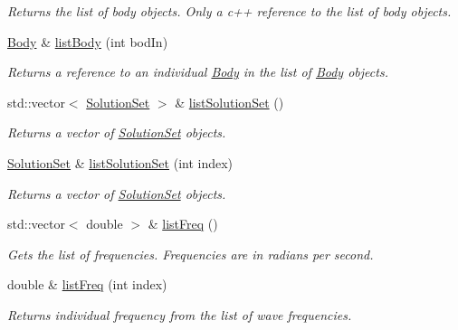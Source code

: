\begin{DoxyCompactItemize}
\begin{DoxyCompactList}\small\item\em Returns the list of body objects. Only a c++ reference to the list of body objects. \end{DoxyCompactList}\item 
\hyperlink{classosea_1_1ofreq_1_1_body}{Body} \& \hyperlink{classosea_1_1ofreq_1_1_output_derived_abda178375c603cd2d2efcc0c5f9c1f10}{list\-Body} (int bod\-In)
\begin{DoxyCompactList}\small\item\em Returns a reference to an individual \hyperlink{classosea_1_1ofreq_1_1_body}{Body} in the list of \hyperlink{classosea_1_1ofreq_1_1_body}{Body} objects. \end{DoxyCompactList}\item 
std\-::vector$<$ \hyperlink{classosea_1_1ofreq_1_1_solution_set}{Solution\-Set} $>$ \& \hyperlink{classosea_1_1ofreq_1_1_output_derived_accfe4955f3f0009638dd68fba75b2785}{list\-Solution\-Set} ()
\begin{DoxyCompactList}\small\item\em Returns a vector of \hyperlink{classosea_1_1ofreq_1_1_solution_set}{Solution\-Set} objects. \end{DoxyCompactList}\item 
\hyperlink{classosea_1_1ofreq_1_1_solution_set}{Solution\-Set} \& \hyperlink{classosea_1_1ofreq_1_1_output_derived_ad8af7121c0f9f84d6e40bc7d0b92b045}{list\-Solution\-Set} (int index)
\begin{DoxyCompactList}\small\item\em Returns a vector of \hyperlink{classosea_1_1ofreq_1_1_solution_set}{Solution\-Set} objects. \end{DoxyCompactList}\item 
std\-::vector$<$ double $>$ \& \hyperlink{classosea_1_1ofreq_1_1_output_derived_aeca7e08a1c561ae61a7a97a59b05cbdf}{list\-Freq} ()
\begin{DoxyCompactList}\small\item\em Gets the list of frequencies. Frequencies are in radians per second. \end{DoxyCompactList}\item 
double \& \hyperlink{classosea_1_1ofreq_1_1_output_derived_ae630f20aca768c789851b82020e2a8c3}{list\-Freq} (int index)
\begin{DoxyCompactList}\small\item\em Returns individual frequency from the list of wave frequencies. \end{DoxyCompactList}\item 

\end{DoxyCompactItemize}
